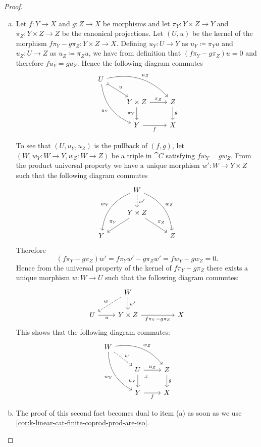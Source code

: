 \begin{proof}
\begin{enumerate}[(a)]\setlength\itemsep{0em}
\item Let \(f: Y \to X\) and \(g: Z \to X\) be morphisms and let
  \(\pi_Y: Y \times Z \to Y\) and \(\pi_Z: Y \times Z \to Z\) be the canonical projections. Let
  \((U, u)\) be the kernel of the morphism
  \(f \pi_Y - g \pi_Z: Y \times Z \to X\). Defining \(u_Y: U \to Y\) as
  \(u_Y \coloneq \pi_Y u\) and \(u_Z: U \to Z\) as \(u_Z \coloneq \pi_Z u\), we have from definition
  that \((f \pi_Y - g \pi_Z) u = 0\) and therefore \(f u_Y = g u_Z\). Hence the
  following diagram commutes
  \[
  \begin{tikzcd}
  U \ar[rrd, "u_Z", bend left]
  \ar[ddr, "u_Y"', bend right]
  \ar[rd, "u", tail]
  & &
  \\
  &Y \times Z \ar[r, "\pi_Z"] \ar[d, "\pi_Y"']
  &Z \ar[d, "g"]
  \\
  &Y \ar[r, "f"']
  &X
  \end{tikzcd}
  \]

  To see that \((U, u_Y, u_Z)\) is the pullback of \((f, g)\), let
  \((W, w_Y: W \to Y, w_Z: W \to Z)\) be a triple in \(\cat C\) satisfying
  \(f w_Y = g w_Z\). From the product universal property we have a unique morphism
  \(w': W \to Y \times Z\) such that the following diagram commutes
  \[
  \begin{tikzcd}
  &W \ar[rdd, bend left, "w_Z"]
  \ar[ldd, bend right, "w_Y"']
  \ar[d, "w'", dashed]
  &
  \\
  &Y \times Z \ar[ld, "\pi_Y"'] \ar[rd, "\pi_Z"]
  &
  \\
  Y & &Z
  \end{tikzcd}
  \]
  Therefore
  \[
  (f \pi_Y - g \pi_Z) w' = f \pi_Y w' - g \pi_Z w' = f w_Y - g w_Z = 0.
  \]
  Hence from the universal property of the kernel of \(f \pi_Y - g \pi_Z\) there
  exists a unique morphism \(w: W \to U\) such that the following diagram commutes:
  \[
  \begin{tikzcd}
  &W
  \ar[ld, "w"', dashed]
  \ar[d, "w'"] & &
  \\
  U
  \ar[r, "u"']
  &Y \times Z
  \ar[rr, "f \pi_Y - g \pi_Z"']
  & &X
  \end{tikzcd}
  \]
  This shows that the following diagram commutes:
  \[
  \begin{tikzcd}
  W \ar[rrd, "w_Z", bend left]
  \ar[ddr, "w_Y"', bend right]
  \ar[rd, "w", dashed]
  & &
  \\
  &U \ar[r, "u_Z"] \ar[d, "u_Y"']
  \ar[rd, phantom, very near start, "\lrcorner"]
  &Z \ar[d, "g"]
  \\
  &Y \ar[r, "f"']
  &X
  \end{tikzcd}
  \]

\item The proof of this second fact becomes dual to item (a) as soon as we use
  \cref{cor:k-linear-cat-finite-coprod-prod-are-iso}.
\end{enumerate}
\end{proof}

